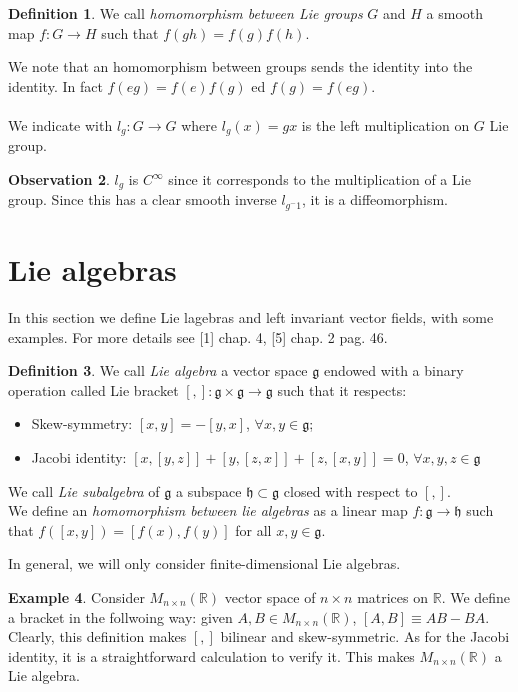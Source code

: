 \documentclass[12pt,a4paper]{report}
\theoremstyle{definition}
\newtheorem{Def}{Definition}[chapter]
\theoremstyle{Theorem}
\theoremstyle{definition}
\newtheorem{Ex}[Def]{Example}
\theoremstyle{definition}
\newtheorem{Obs}[Def]{Observation}
\begin{document}
		\begin{Def}
			We call \textit{homomorphism between Lie groups} $G$ and $H$ a smooth map $f:G\rightarrow H$ such that $f(gh)=f(g)f(h)$.
		\end{Def}
		We note that an homomorphism between groups sends the identity into the identity. In fact $f(eg)=f(e)f(g)$ ed $f(g)=f(eg)$.\\\\
		We indicate with $l_g:G\rightarrow G$ where $l_g(x)=gx$ is the left multiplication on $G$ Lie group.
		\begin{Obs}
			$l_g$ is $C^\infty$ since it corresponds to the multiplication of a Lie group. Since this has a clear smooth inverse $l_{g^-1}$, it is a diffeomorphism.
		\end{Obs}
		\section{Lie algebras}
		In this section we define Lie lagebras and left invariant vector fields, with some examples. For more details see [1] chap. 4, [5] chap. 2 pag. 46.
		\begin{Def}
			We call \textit{Lie algebra} a vector space $\mathfrak{g}$ endowed with a binary operation called Lie bracket $[,]:\mathfrak{g}\times\mathfrak{g}\rightarrow\mathfrak{g}$ such that it respects:
			\begin{itemize}
				\item Skew-symmetry: $[x,y]=-[y,x]$, $\forall x,y\in\mathfrak{g}$;
				\item Jacobi identity: $[x,[y,z]]+[y,[z,x]]+[z,[x,y]]=0$, $\forall x,y,z\in \mathfrak{g}$ 
			\end{itemize}
			We call \textit{Lie subalgebra} of $\mathfrak{g}$ a subspace $\mathfrak{h}\subset\mathfrak{g}$ closed with respect to $[,]$.\\
			We define an \textit{homomorphism between lie algebras} as a linear map $f:\mathfrak{g}\rightarrow\mathfrak{h}$ such that $f([x,y])=[f(x),f(y)]$ for all $x,y\in\mathfrak{g}$.
		\end{Def}
		In general, we will only consider finite-dimensional Lie algebras.
		\begin{Ex} \label{Obs: bracket Mnn}
			Consider $M_{n\times n}(\mathbb{R})$ vector space of $n\times n$ matrices on $\mathbb{R}$. We define a bracket in the follwoing way: given $A,B\in M_{n\times n}(\mathbb{R})$, $[A,B]\equiv AB-BA$. Clearly, this definition makes $[,]$ bilinear and skew-symmetric. As for the Jacobi identity, it is a straightforward calculation to verify it. This makes $M_{n\times n}(\mathbb{R})$ a Lie algebra. 
		\end{Ex}
\end{document}
